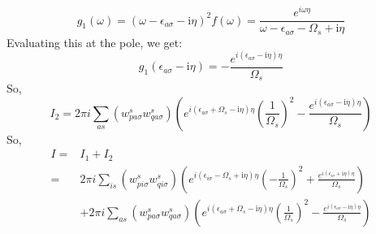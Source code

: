 \documentclass[12pt]{article}
\begin{document}
\begin{equation}
g_1(\omega) = \left( \omega - \epsilon_{a \sigma} - \mathrm{i} \eta \right)^2 f(\omega) = \frac{e^{i \omega \eta}}{\omega - \epsilon_{a \sigma} - \Omega_s + \mathrm{i} \eta}
\end{equation}
Evaluating this at the pole, we get:
\begin{equation}
g_1(\epsilon_{a \sigma} - \mathrm{i} \eta) = -\frac{e^{i (\epsilon_{a \sigma} - \mathrm{i} \eta) \eta}}{\Omega_s}
\end{equation}
So,
\begin{equation}
I_2 = 2\pi i \sum_{as} \left( w_{p a \sigma}^s w_{q a \sigma}^s \right) \left( e^{i \left( \epsilon_{a \sigma} + \Omega_s - \mathrm{i} \eta \right) \eta} \left( \frac{1}{\Omega_s} \right)^2 - \frac{e^{i \left( \epsilon_{a \sigma} - \mathrm{i} \eta \right) \eta}}{\Omega_s} \right)
\end{equation}
So,
\begin{equation}
\begin{aligned}
I = & I_1 + I_2\\
= & 2\pi i \sum_{is} \left( w_{p i \sigma}^s w_{q i \sigma}^s \right) \left( e^{i \left( \epsilon_{i \sigma} - \Omega_s + \mathrm{i} \eta \right) \eta} \left( -\frac{1}{\Omega_s} \right)^2 + \frac{e^{i \left( \epsilon_{i \sigma} + \mathrm{i} \eta \right) \eta}}{\Omega_s} \right)\\
& + 2\pi i \sum_{as} \left( w_{p a \sigma}^s w_{q a \sigma}^s \right) \left( e^{i \left( \epsilon_{a \sigma} + \Omega_s - \mathrm{i} \eta \right) \eta} \left( \frac{1}{\Omega_s} \right)^2 - \frac{e^{i \left( \epsilon_{a \sigma} - \mathrm{i} \eta \right) \eta}}{\Omega_s} \right)
\end{aligned}
\end{equation}
\end{document}

